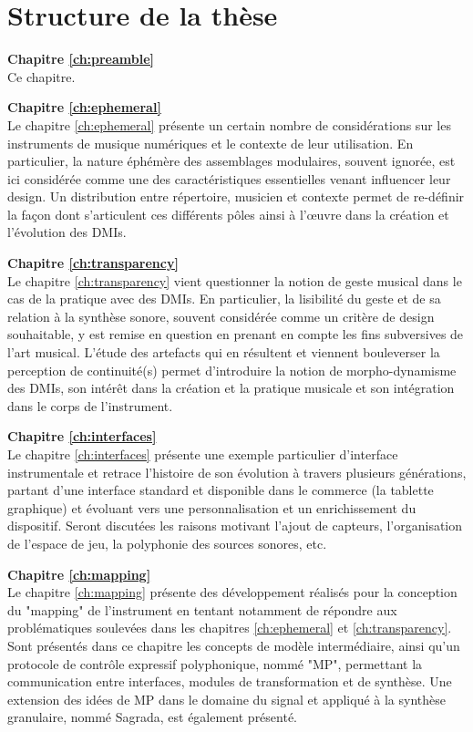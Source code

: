 \section{Structure de la thèse}
\label{sec:preamble:structure}

\textbf{Chapitre \ref{ch:preamble}} \\[0.2em]
Ce chapitre.

\textbf{Chapitre \ref{ch:ephemeral}} \\[0.2em]
Le chapitre \ref{ch:ephemeral} présente un certain nombre de considérations sur les instruments de musique numériques et le contexte de leur utilisation. En particulier, la nature éphémère des assemblages modulaires, souvent ignorée, est ici considérée comme une des caractéristiques essentielles venant influencer leur design. Un distribution entre répertoire, musicien et contexte permet de re-définir la façon dont s'articulent ces différents pôles ainsi à l'œuvre dans la création et l'évolution des DMIs.

\textbf{Chapitre \ref{ch:transparency}} \\[0.2em]
Le chapitre \ref{ch:transparency} vient questionner la notion de geste musical dans le cas de la pratique avec des DMIs. En particulier, la lisibilité du geste et de sa relation à la synthèse sonore, souvent considérée comme un critère de design souhaitable, y est remise en question en prenant en compte les fins subversives de l'art musical. L'étude des artefacts qui en résultent et viennent bouleverser la perception de continuité(s) permet d'introduire la notion de morpho-dynamisme des DMIs, son intérêt dans la création et la pratique musicale et son intégration dans le corps de l'instrument.

\textbf{Chapitre \ref{ch:interfaces}} \\[0.2em]
Le chapitre \ref{ch:interfaces} présente une exemple particulier d'interface instrumentale et retrace l'histoire de son évolution à travers plusieurs générations, partant d'une interface standard et disponible dans le commerce (la tablette graphique) et évoluant vers une personnalisation et un enrichissement du dispositif. 
Seront discutées les raisons motivant l'ajout de capteurs, l'organisation de l'espace de jeu, la polyphonie des sources sonores, etc.

\textbf{Chapitre \ref{ch:mapping}} \\[0.2em]
Le chapitre \ref{ch:mapping} présente des développement réalisés pour la conception du "mapping" de l'instrument en tentant notamment de répondre aux problématiques soulevées dans les chapitres \ref{ch:ephemeral} et \ref{ch:transparency}. Sont présentés dans ce chapitre les concepts de modèle intermédiaire, ainsi qu'un protocole de contrôle expressif polyphonique, nommé "MP", permettant la communication entre interfaces, modules de transformation et de synthèse. Une extension des idées de MP dans le domaine du signal et appliqué à la synthèse granulaire, nommé Sagrada, est également présenté.

